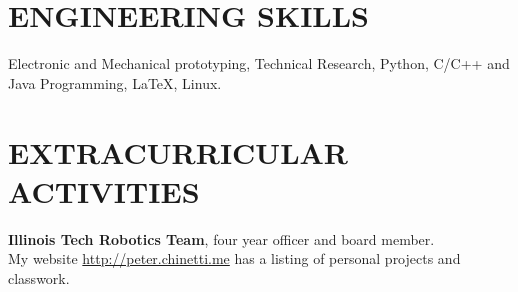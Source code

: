 \documentclass{res}
\begin{document}
\begin{resume}


\section{ENGINEERING SKILLS}          
Electronic and Mechanical prototyping, Technical Research, Python, C/C++ and Java Programming, \LaTeX{}, Linux.
 
 
 
\section{EXTRACURRICULAR ACTIVITIES}          
    {\bf Illinois Tech Robotics Team}, four year officer and board member.\\
    My website \url{http://peter.chinetti.me} has a listing of personal projects and classwork.
\end{resume}
\end{document}

